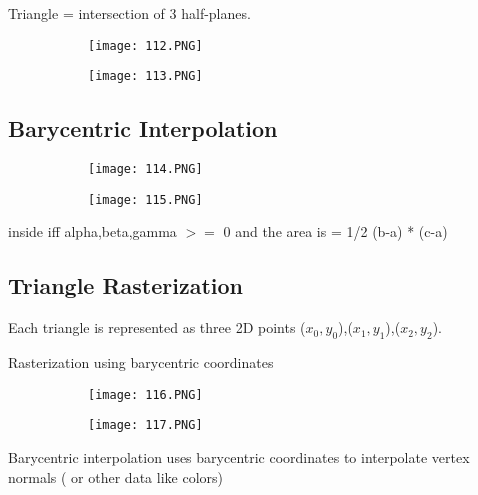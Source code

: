 \documentclass{article}
\begin{document}
Triangle = intersection of 3 half-planes.

\begin{figure}[ht!]
  \centering
  \begin{subfigure}[b]{0.49\linewidth}
    \texttt{[image: 112.PNG]}
  \end{subfigure}
  \begin{subfigure}[b]{0.5\textwidth}
         \centering
         \texttt{[image: 113.PNG]}
     \end{subfigure}
\end{figure}


\subsection{Barycentric Interpolation}

\begin{figure}[ht!]
  \centering
  \begin{subfigure}[b]{0.49\linewidth}
    \texttt{[image: 114.PNG]}
  \end{subfigure}
  \begin{subfigure}[b]{0.5\textwidth}
         \centering
         \texttt{[image: 115.PNG]}
     \end{subfigure}
\end{figure}

inside iff alpha,beta,gamma $>=$ 0 and the area is = 1/2 (b-a) * (c-a)

\subsection{Triangle Rasterization}

Each triangle is represented as three 2D points ($x_0,y_0$),($x_1,y_1$),($x_2,y_2$).

Rasterization using barycentric coordinates

\begin{figure}[ht!]
  \centering
  \begin{subfigure}[b]{0.49\linewidth}
    \texttt{[image: 116.PNG]}
  \end{subfigure}
  \begin{subfigure}[b]{0.3\textwidth}
         \centering
         \texttt{[image: 117.PNG]}
     \end{subfigure}
\end{figure}

Barycentric interpolation uses barycentric coordinates to interpolate vertex normals ( or other data like colors)
\end{document}
